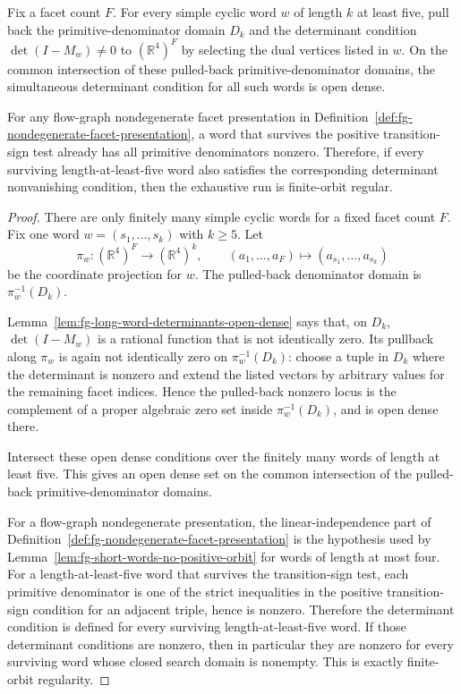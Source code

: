\begin{unverified}
\begin{fact}%
\label{fact:fg-finite-orbit-regular-open-dense}
Fix a facet count \(F\).  For every simple cyclic word \(w\) of length \(k\) at
least five, pull back the primitive-denominator domain \(D_k\) and the
determinant condition \(\det(I-M_w)\ne0\) to \((\mathbb R^4)^F\) by selecting
the dual vertices listed in \(w\).  On the common intersection of these
pulled-back primitive-denominator domains, the simultaneous determinant
condition for all such words is open dense.

For any flow-graph nondegenerate facet presentation in
Definition~\ref{def:fg-nondegenerate-facet-presentation}, a word that survives
the positive transition-sign test already has all primitive denominators
nonzero.  Therefore, if every surviving length-at-least-five word also
satisfies the corresponding determinant nonvanishing condition, then the
exhaustive run is finite-orbit regular.
\end{fact}

\begin{proof}
There are only finitely many simple cyclic words for a fixed facet count
\(F\).  Fix one word \(w=(s_1,\ldots,s_k)\) with \(k\ge5\).  Let
\[
  \pi_w:(\mathbb R^4)^F\to(\mathbb R^4)^k,\qquad
  (a_1,\ldots,a_F)\mapsto(a_{s_1},\ldots,a_{s_k})
\]
be the coordinate projection for \(w\).  The pulled-back denominator domain is
\(\pi_w^{-1}(D_k)\).

Lemma~\ref{lem:fg-long-word-determinants-open-dense} says that, on \(D_k\),
\(\det(I-M_w)\) is a rational function that is not identically zero.  Its
pullback along \(\pi_w\) is again not identically zero on
\(\pi_w^{-1}(D_k)\): choose a tuple in \(D_k\) where the determinant is
nonzero and extend the listed vectors by arbitrary values for the remaining
facet indices.  Hence the pulled-back nonzero locus is the complement of a
proper algebraic zero set inside \(\pi_w^{-1}(D_k)\), and is open dense there.

Intersect these open dense conditions over the finitely many words of length
at least five.  This gives an open dense set on the common intersection of the
pulled-back primitive-denominator domains.

For a flow-graph nondegenerate presentation, the linear-independence part of
Definition~\ref{def:fg-nondegenerate-facet-presentation} is the hypothesis used
by Lemma~\ref{lem:fg-short-words-no-positive-orbit} for words of length at
most four.  For a length-at-least-five word that survives the transition-sign
test, each primitive denominator is one of the strict inequalities in the
positive transition-sign condition for an adjacent triple, hence is nonzero.
Therefore the determinant condition is defined for every surviving
length-at-least-five word.  If those determinant conditions are nonzero, then
in particular they are nonzero for every surviving word whose closed search
domain is nonempty.  This is exactly finite-orbit regularity.
\end{proof}
\end{unverified}

